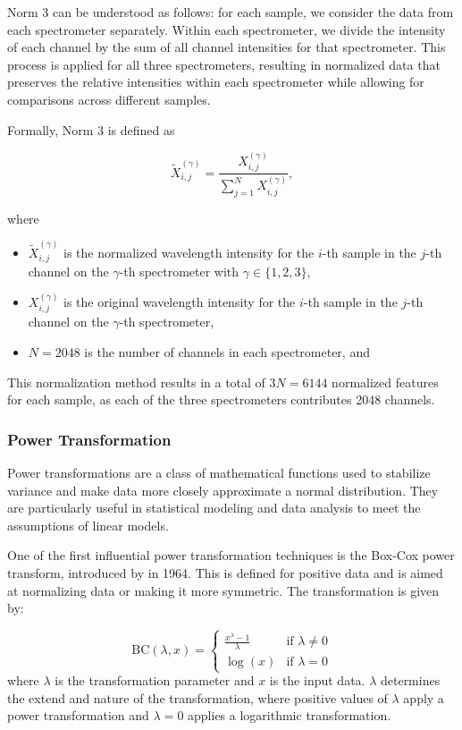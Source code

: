 Norm 3 can be understood as follows: for each sample, we consider the data from each spectrometer separately. Within each spectrometer, we divide the intensity of each channel by the sum of all channel intensities for that spectrometer. This process is applied for all three spectrometers, resulting in normalized data that preserves the relative intensities within each spectrometer while allowing for comparisons across different samples.

Formally, Norm 3 is defined as

\begin{equation}
	\tilde{X}_{i,j}^{(\gamma)} = \frac{X_{i,j}^{(\gamma)}}{\sum_{j=1}^{N} X_{i,j}^{(\gamma)}},
\end{equation}

where

\begin{itemize}
	\item $\tilde{X}_{i,j}^{(\gamma)}$ is the normalized wavelength intensity for the $i$-th sample in the $j$-th channel on the $\gamma$-th spectrometer with $\gamma \in \{1, 2, 3\}$,
	\item $X_{i,j}^{(\gamma)}$ is the original wavelength intensity for the $i$-th sample in the $j$-th channel on the $\gamma$-th spectrometer,
	\item $N = 2048$ is the number of channels in each spectrometer, and
\end{itemize}

This normalization method results in a total of $3N = 6144$ normalized features for each sample, as each of the three spectrometers contributes 2048 channels.

\subsubsection{Power Transformation}
Power transformations are a class of mathematical functions used to stabilize variance and make data more closely approximate a normal distribution. 
They are particularly useful in statistical modeling and data analysis to meet the assumptions of linear models.

One of the first influential power transformation techniques is the Box-Cox power transform, introduced by \citet{BoxAndCox} in 1964.
This is defined for positive data and is aimed at normalizing data or making it more symmetric. The transformation is given by:

$$ 
\text{BC}(\lambda, x) = 
\begin{cases} 
\frac{x^\lambda - 1}{\lambda} & \text{if } \lambda \neq 0 \\
\log(x) & \text{if } \lambda = 0 
\end{cases} 
$$
where $ \lambda $ is the transformation parameter and $x$ is the input data. 
$\lambda$ determines the extend and nature of the transformation, where positive values of $\lambda$ apply a power transformation and $\lambda = 0$ applies a logarithmic transformation.

